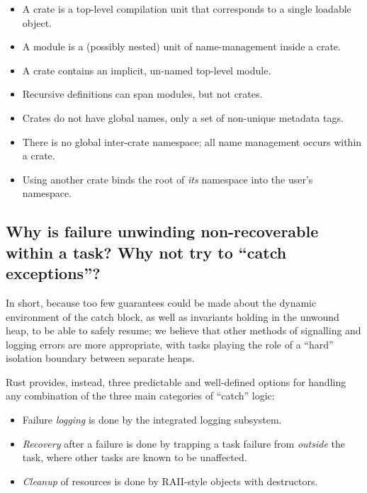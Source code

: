 \documentclass[]{article}
\begin{document}
\begin{itemize}
\itemsep1pt\parskip0pt
\item
  A crate is a top-level compilation unit that corresponds to a single
  loadable object.
\item
  A module is a (possibly nested) unit of name-management inside a
  crate.
\item
  A crate contains an implicit, un-named top-level module.
\item
  Recursive definitions can span modules, but not crates.
\item
  Crates do not have global names, only a set of non-unique metadata
  tags.
\item
  There is no global inter-crate namespace; all name management occurs
  within a crate.
\item
  Using another crate binds the root of \emph{its} namespace into the
  user's namespace.
\end{itemize}

\subsection{Why is failure unwinding non-recoverable within a task? Why
not try to ``catch
exceptions''?}\label{why-is-failure-unwinding-non-recoverable-within-a-task-why-not-try-to-catch-exceptions}

In short, because too few guarantees could be made about the dynamic
environment of the catch block, as well as invariants holding in the
unwound heap, to be able to safely resume; we believe that other methods
of signalling and logging errors are more appropriate, with tasks
playing the role of a ``hard'' isolation boundary between separate
heaps.

Rust provides, instead, three predictable and well-defined options for
handling any combination of the three main categories of ``catch''
logic:

\begin{itemize}
\itemsep1pt\parskip0pt
\item
  Failure \emph{logging} is done by the integrated logging subsystem.
\item
  \emph{Recovery} after a failure is done by trapping a task failure
  from \emph{outside} the task, where other tasks are known to be
  unaffected.
\item
  \emph{Cleanup} of resources is done by RAII-style objects with
  destructors.
\end{itemize}
\end{document}
